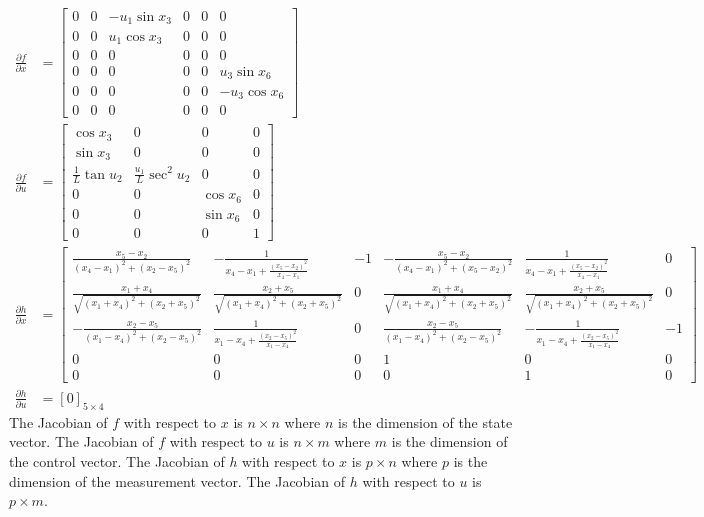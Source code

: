 \documentclass[11pt]{article}
\begin{document}
\begin{align*}
    \frac{\partial f}{\partial x} &= \begin{bmatrix} 0 & 0 & -u_1\sin x_3 & 0 & 0 & 0 \\ 0 & 0 & u_1\cos x_3 & 0 & 0 & 0 \\ 0 & 0 & 0 & 0 & 0 & 0 \\ 0 & 0 & 0 & 0 & 0 & u_3\sin x_6 \\ 0 & 0 & 0 & 0 & 0 & -u_3 \cos x_6 \\ 0 & 0 & 0 & 0 & 0 & 0 \end{bmatrix} \\
    \frac{\partial f}{\partial u} &= \begin{bmatrix} \cos x_3 & 0 & 0 & 0 \\ \sin x_3 & 0 & 0 & 0 \\ \frac{1}{L} \tan u_2 & \frac{u_1}{L}\sec^2u_2 & 0 & 0 \\ 0 & 0 & \cos x_6 & 0 \\ 0 & 0 & \sin x_6 & 0 \\ 0 & 0 & 0 & 1 \end{bmatrix} \\
    \frac{\partial h}{\partial x} &= \begin{bmatrix} \frac{x_5-x_2}{(x_4-x_1)^2+(x_2-x_5)^2} & -\frac{1}{x_4-x_1+\frac{(x_5-x_2)^2}{x_4-x_1}} & -1 & -\frac{x_5-x_2}{(x_4-x_1)^2+(x_5-x_2)^2} & \frac{1}{x_4-x_1+\frac{(x_5-x_2)^2}{x_4-x_1}} & 0 \\
    \frac{x_1+x_4}{\sqrt{(x_1+x_4)^2+(x_2+x_5)^2}} & \frac{x_2+x_5}{\sqrt{(x_1+x_4)^2+(x_2+x_5)^2}} & 0 & \frac{x_1 + x_4}{\sqrt{(x_1+x_4)^2+(x_2+x_5)^2}} & \frac{x_2+x_5}{\sqrt{(x_1+x_4)^2+(x_2+x_5)^2}} & 0 \\ -\frac{x_2-x_5}{(x_1-x_4)^2+(x_2-x_5)^2} & \frac{1}{x_1-x_4+\frac{(x_2-x_5)^2}{x_1-x_4}} & 0 & \frac{x_2-x_5}{(x_1-x_4)^2+(x_2-x_5)^2} & -\frac{1}{x_1-x_4+\frac{(x_2-x_5)^2}{x_1-x_4}} & -1 \\ 0 & 0 & 0 & 1 & 0 & 0 \\ 0 & 0 & 0 & 0 & 1 & 0 \end{bmatrix} \\
    \frac{\partial h}{\partial u} &= [0]_{5\times 4}
\end{align*}
The Jacobian of $f$ with respect to $x$ is $n\times n$ where $n$ is the dimension of the state vector. The Jacobian of $f$ with respect to $u$ is $n \times m$ where $m$ is the dimension of the control vector. The Jacobian of $h$ with respect to $x$ is $p \times n$ where $p$ is the dimension of the measurement vector. The Jacobian of $h$ with respect to $u$ is $p\times m$.\\
\end{document}
